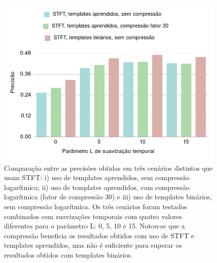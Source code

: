         \begin{figure}[h]
            \begin{center}
                \includegraphics[width=13cm]{figuras/13-stft-learn-bin-compressao-smooth.png}
                \caption{\label{fig:exp:stft-learn-bin-compressao-smooth}Comparação entre as precisões obtidas em três cenários distintos que usam STFT: i) uso de templates aprendidos, sem compressão logarítmica; ii) uso de templates aprendidos, com compressão logarítmica (fator de compressão 30) e iii) uso de templates binários, sem compressão logarítmica. Os três cenários foram testados combinados com suavizações temporais com quatro valores diferentes para o parâmetro L: 0, 5, 10 e 15. Notou-se que a compressão beneficia os resultados obtidos com uso de STFT e templates aprendidos, mas não é suficiente para superar os resultados obtidos com templates binários.}
            \end{center}
        \end{figure}
